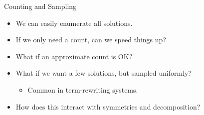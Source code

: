 \documentclass[aspectratio=169,compress,10pt]{beamer}
\begin{document}
\begin{frame}{Counting and Sampling}
    \begin{itemize}
        \item We can easily enumerate all solutions.
        \item If we only need a count, can we speed things up?
        \item <2-> What if an approximate count is OK?
        \item <3-> What if we want a few solutions, but sampled uniformly?
            \begin{itemize}
                \item Common in term-rewriting systems.
            \end{itemize}
        \item <4-> How does this interact with symmetries and decomposition?
    \end{itemize}
\end{frame}
\end{document}

